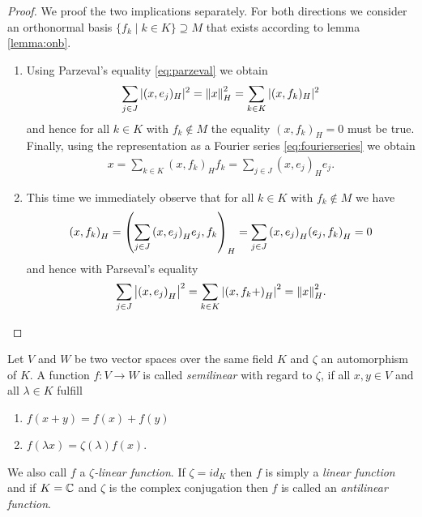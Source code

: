 \begin{proof}
	We proof the two implications separately. For both directions we consider an orthonormal basis $\{f_k \mid k \in K\} \supseteq M$ that exists according to lemma \ref{lemma:onb}. 
	\begin{enumerate}
		\item[\Quote{$\Rightarrow$}]  Using Parzeval's equality \eqref{eq:parzeval} we obtain
		\begin{align*}
		\sum_{j \in J} |(x, e_j)_H|^2 = \norm[H]{x}^2 = \sum_{k \in K} |(x,f_k)_H|^2
		\end{align*}
		and hence for all $k \in K$ with $f_k \notin M$
		 the equality $(x, f_k)_H = 0$ must be true. Finally, using the representation as a Fourier series \eqref{eq:fourierseries} we obtain
		\begin{align*}
		x = \sum_{k \in K} (x,f_k)_H f_k = \sum_{j \in J} (x,e_j)_H e_j.
		\end{align*}
		
		\item[\Quote{$\Leftarrow$}] This time we immediately observe that for all $k \in K$ with $f_k \notin M$ we have 
		\begin{align*}
			\pbraces{x, f_k}_H = \pbraces{\sum_{j \in J} \pbraces{x, e_j}_H e_j, f_k}_H = \sum_{j \in J} \pbraces{x, e_j}_H \pbraces{e_j, f_k}_H = 0
		\end{align*}
		and hence with Parseval's equality
		\begin{align*}
			\sum_{j \in J} \vbraces{\pbraces{x,e_j}_H}^2 = \sum_{k \in K} \vbraces{\pbraces{x,f_k+}_H}^2 = \norm[H]{x}^2.
		\end{align*}
	\end{enumerate}
	
\end{proof}



\begin{definition}
	Let $V$ and $W$ be two vector spaces over the same field $K$ and $\zeta$ an automorphism of $K$. A function $f: V \to W$ is called \textit{semilinear} with regard to $\zeta$, if all $x,y \in V$ and all $\lambda \in K$ fulfill
	\begin{enumerate}
		\item $f(x + y) = f(x) + f(y)$
		\item $f(\lambda x) = \zeta(\lambda) f(x)$.
	\end{enumerate}
	We also call $f$ a $\zeta$\textit{-linear function}. If $\zeta = id_K$ then $f$ is simply a \textit{linear function} and if $K = \C$ and $\zeta$ is the complex conjugation then $f$ is called an \textit{antilinear function}.
\end{definition}


